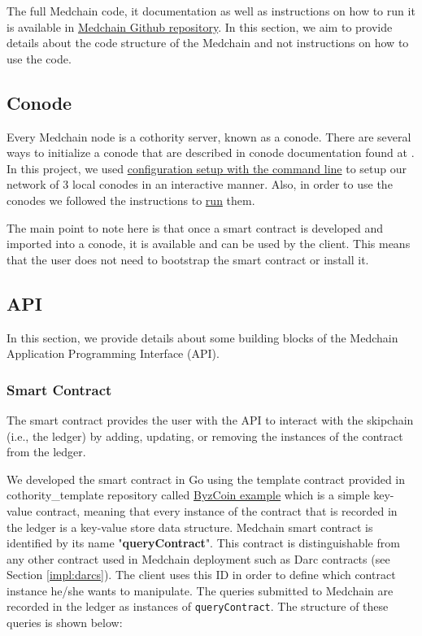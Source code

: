 The full Medchain code, it documentation as well as instructions on how to run it is available in \href{https://github.com/ldsec/medchain/tree/dev}{Medchain Github repository}. In this section, we aim to provide details about the code structure of the Medchain and not instructions on how to use the code.  

\subsection{Conode}
Every Medchain node is a cothority server, known as a conode. There are several ways to initialize a conode that are described in conode documentation found at \cite{conode:2019}. In this project, we used \href{https://github.com/dedis/cothority/blob/master/conode/README.md#option-1-computer-configuration-setup-with-the-command-line}{configuration setup with the command line} to setup our network of 3 local conodes in an interactive manner. Also, in order to use the conodes we followed the instructions to \href{https://github.com/dedis/cothority/blob/master/conode/README.md#option-1-computer-run-with-the-command-line}{run} them. 

The main point to note here is that once a smart contract is developed and imported into a conode, it is available and can be used by the client. This means that the user does not need to bootstrap the smart contract or install it.  

\subsection{API}
In this section, we provide details about some building blocks of the Medchain Application Programming Interface (API). 

\subsubsection{Smart Contract} \label{impl:smart_contract}
The smart contract provides the user with the API to interact with the skipchain (i.e., the ledger) by adding, updating, or removing the instances of the contract from the ledger. 

We developed the smart contract in Go using the template contract provided in cothority\_template repository called  \href{https://github.com/dedis/cothority_template/tree/master/byzcoin}{ByzCoin example} which is a simple key-value contract, meaning that every instance of the contract that is recorded in the ledger is a key-value store data structure. Medchain smart contract is identified by its name "\textbf{queryContract}". This contract is distinguishable from any other contract used in Medchain deployment such as Darc contracts (see Section \ref{impl:darcs}). The client uses this ID in order to define which contract instance he/she wants to manipulate. The queries submitted to Medchain are recorded in the ledger as instances of \texttt{queryContract}. The structure of these queries is shown below: 


